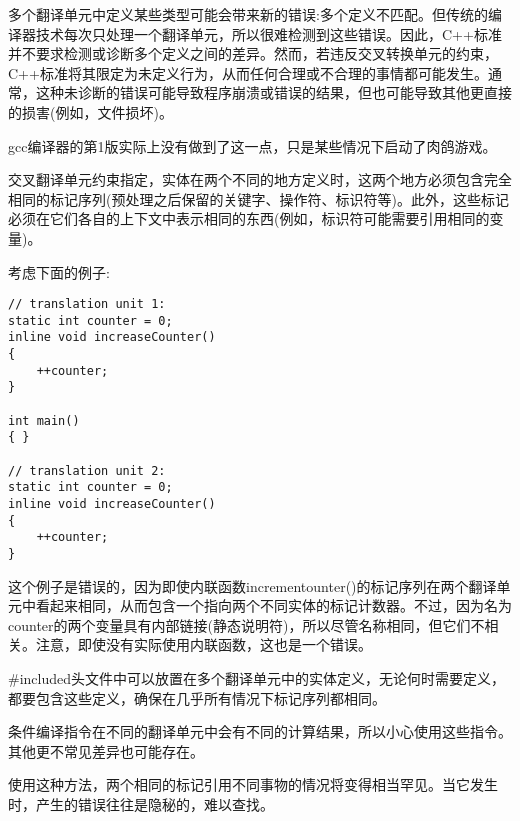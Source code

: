 
多个翻译单元中定义某些类型可能会带来新的错误:多个定义不匹配。但传统的编译器技术每次只处理一个翻译单元，所以很难检测到这些错误。因此，C++标准并不要求检测或诊断多个定义之间的差异。然而，若违反交叉转换单元的约束，C++标准将其限定为未定义行为，从而任何合理或不合理的事情都可能发生。通常，这种未诊断的错误可能导致程序崩溃或错误的结果，但也可能导致其他更直接的损害(例如，文件损坏)。

\begin{tcolorbox}[colback=webgreen!5!white,colframe=webgreen!75!black]
\hspace*{0.75cm}gcc编译器的第1版实际上没有做到了这一点，只是某些情况下启动了肉鸽游戏。
\end{tcolorbox}

交叉翻译单元约束指定，实体在两个不同的地方定义时，这两个地方必须包含完全相同的标记序列(预处理之后保留的关键字、操作符、标识符等)。此外，这些标记必须在它们各自的上下文中表示相同的东西(例如，标识符可能需要引用相同的变量)。

考虑下面的例子:

\begin{lstlisting}[style=styleCXX]
// translation unit 1:
static int counter = 0;
inline void increaseCounter()
{
	++counter;
}

int main()
{ }

// translation unit 2:
static int counter = 0;
inline void increaseCounter()
{
	++counter;
}
\end{lstlisting}

这个例子是错误的，因为即使内联函数incrementounter()的标记序列在两个翻译单元中看起来相同，从而包含一个指向两个不同实体的标记计数器。不过，因为名为counter的两个变量具有内部链接(静态说明符)，所以尽管名称相同，但它们不相关。注意，即使没有实际使用内联函数，这也是一个错误。

\#included头文件中可以放置在多个翻译单元中的实体定义，无论何时需要定义，都要包含这些定义，确保在几乎所有情况下标记序列都相同。

\begin{tcolorbox}[colback=webgreen!5!white,colframe=webgreen!75!black]
\hspace*{0.75cm}条件编译指令在不同的翻译单元中会有不同的计算结果，所以小心使用这些指令。其他更不常见差异也可能存在。
\end{tcolorbox}

使用这种方法，两个相同的标记引用不同事物的情况将变得相当罕见。当它发生时，产生的错误往往是隐秘的，难以查找。

